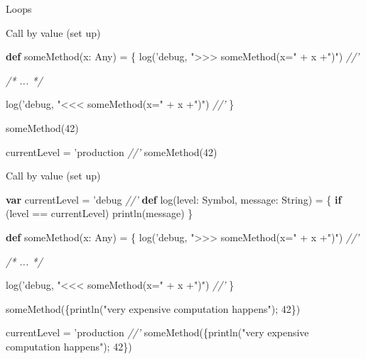 \documentclass[ignorenonframetext,]{beamer}
\newenvironment{Shaded}{\begin{snugshade}}{\end{snugshade}}
\newcommand{\KeywordTok}[1]{\textcolor[rgb]{0.13,0.29,0.53}{\textbf{#1}}}
\newcommand{\DecValTok}[1]{\textcolor[rgb]{0.00,0.00,0.81}{#1}}
\newcommand{\StringTok}[1]{\textcolor[rgb]{0.31,0.60,0.02}{#1}}
\newcommand{\CommentTok}[1]{\textcolor[rgb]{0.56,0.35,0.01}{\textit{#1}}}
\newcommand{\FunctionTok}[1]{\textcolor[rgb]{0.00,0.00,0.00}{#1}}
\newcommand{\NormalTok}[1]{#1}
\begin{document}
\begin{frame}[fragile]{Loops}
\begin{block}{Call by value (set up)}
\begin{Shaded}
\begin{Highlighting}[]
\KeywordTok{def} \FunctionTok{someMethod}\NormalTok{(x: Any) = \{}
  \FunctionTok{log}\NormalTok{('debug, }\StringTok{">>> someMethod(x="}\NormalTok{ + x +}\StringTok{")"}\NormalTok{)                                                         }\CommentTok{//'}
  
  \CommentTok{/* ... */}
  
  \FunctionTok{log}\NormalTok{('debug, }\StringTok{"<<< someMethod(x="}\NormalTok{ + x +}\StringTok{")"}\NormalTok{)                                                         }\CommentTok{//'}
\NormalTok{\}}

\FunctionTok{someMethod}\NormalTok{(}\DecValTok{42}\NormalTok{)}

\NormalTok{currentLevel = 'production                                                         }\CommentTok{//'}
\FunctionTok{someMethod}\NormalTok{(}\DecValTok{42}\NormalTok{)}
\end{Highlighting}
\end{Shaded}

\end{block}

\begin{block}{Call by value (set up)}

\begin{Shaded}
\begin{Highlighting}[]
\KeywordTok{var}\NormalTok{ currentLevel = 'debug                                                         }\CommentTok{//'}
\KeywordTok{def} \FunctionTok{log}\NormalTok{(level: Symbol, message: String) = \{}
  \KeywordTok{if}\NormalTok{ (level == currentLevel)}
    \FunctionTok{println}\NormalTok{(message)}
\NormalTok{\}}

\KeywordTok{def} \FunctionTok{someMethod}\NormalTok{(x: Any) = \{}
  \FunctionTok{log}\NormalTok{('debug, }\StringTok{">>> someMethod(x="}\NormalTok{ + x +}\StringTok{")"}\NormalTok{)                                                         }\CommentTok{//'}
  
  \CommentTok{/* ... */}
  
  \FunctionTok{log}\NormalTok{('debug, }\StringTok{"<<< someMethod(x="}\NormalTok{ + x +}\StringTok{")"}\NormalTok{)                                                         }\CommentTok{//'}
\NormalTok{\}}

\FunctionTok{someMethod}\NormalTok{(\{}\FunctionTok{println}\NormalTok{(}\StringTok{"very expensive computation happens"}\NormalTok{); }\DecValTok{42}\NormalTok{\})}

\NormalTok{currentLevel = 'production                                                         }\CommentTok{//'}
\FunctionTok{someMethod}\NormalTok{(\{}\FunctionTok{println}\NormalTok{(}\StringTok{"very expensive computation happens"}\NormalTok{); }\DecValTok{42}\NormalTok{\})}
\end{Highlighting}
\end{Shaded}


\end{block}
\end{frame}
\end{document}
